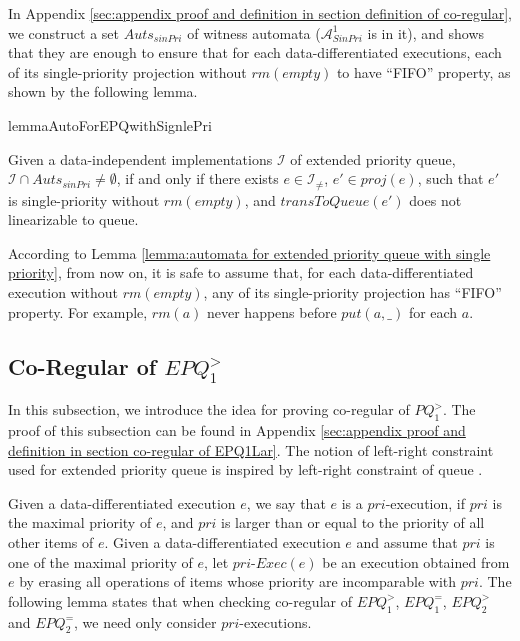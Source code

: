 In Appendix \ref{sec:appendix proof and definition in section definition of co-regular}, we construct a set $\textit{Auts}_{\textit{sinPri}}$ of witness automata ($\mathcal{A}_{\textit{SinPri}}^1$ is in it), and shows that they are enough to ensure that for each data-differentiated executions, each of its single-priority projection without $\textit{rm}(\textit{empty})$ to have ``FIFO'' property, as shown by the following lemma.

\begin{restatable}{lemma}{AutoForEPQwithSignlePri}
\label{lemma:automata for extended priority queue with single priority}

Given a data-independent implementations $\mathcal{I}$ of extended priority queue, $\mathcal{I} \cap \textit{Auts}_{\textit{sinPri}} \neq \emptyset$, if and only if there exists $e \in \mathcal{I}_{\neq}$, $e' \in \textit{proj}(e)$, such that $e'$ is single-priority  without $\textit{rm}(\textit{empty})$, and $\textit{transToQueue}(e')$ does not linearizable to queue.
\end{restatable}

According to Lemma \ref{lemma:automata for extended priority queue with single priority}, from now on, it is safe to assume that, for each data-differentiated execution without $\textit{rm}(\textit{empty})$, any of its single-priority projection has ``FIFO'' property. For example, $\textit{rm}(a)$ never happens before $\textit{put}(a,\_)$ for each $a$.



\subsection{Co-Regular of $\textit{EPQ}_1^{>}$}
\label{subsec:co-regular of EPQ1Lar}

In this subsection, we introduce the idea for proving co-regular of $\textit{PQ}_1^{>}$. The proof of this subsection can be found in Appendix \ref{sec:appendix proof and definition in section co-regular of EPQ1Lar}. The notion of left-right constraint used for extended priority queue is inspired by left-right constraint of queue \cite{Bouajjani:2015}.

Given a data-differentiated execution $e$, we say that $e$ is a $\textit{pri}$-execution, if $\textit{pri}$ is the maximal priority of $e$, and $\textit{pri}$ is larger than or equal to the priority of all other items of $e$. Given a data-differentiated execution $e$ and assume that $\textit{pri}$ is one of the maximal priority of $e$, let $\textit{pri-Exec}(e)$ be an execution obtained from $e$ by erasing all operations of items whose priority are incomparable with $\textit{pri}$. The following lemma states that when checking co-regular of $\textit{EPQ}_1^{>}$, $\textit{EPQ}_1^{=}$, $\textit{EPQ}_2^{>}$ and $\textit{EPQ}_2^{=}$, we need only consider $\textit{pri}$-executions.

